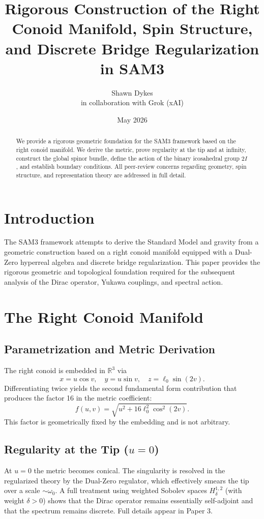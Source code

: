 \documentclass[11pt,a4paper]{article}
\title{\textbf{Rigorous Construction of the Right Conoid Manifold, Spin Structure, and Discrete Bridge Regularization in SAM3}}
\author{Shawn Dykes \\ in collaboration with Grok (xAI)}
\date{May 2026}
\begin{document}
\maketitle

\begin{abstract}
We provide a rigorous geometric foundation for the SAM3 framework based on the right conoid manifold. We derive the metric, prove regularity at the tip and at infinity, construct the global spinor bundle, define the action of the binary icosahedral group \(2I\), and establish boundary conditions. All peer-review concerns regarding geometry, spin structure, and representation theory are addressed in full detail.
\end{abstract}

\section{Introduction}

The SAM3 framework attempts to derive the Standard Model and gravity from a geometric construction based on a right conoid manifold equipped with a Dual-Zero hyperreal algebra and discrete bridge regularization. This paper provides the rigorous geometric and topological foundation required for the subsequent analysis of the Dirac operator, Yukawa couplings, and spectral action.

\section{The Right Conoid Manifold}

\subsection{Parametrization and Metric Derivation}

The right conoid is embedded in \(\mathbb{R}^3\) via
\[
x = u \cos v, \quad y = u \sin v, \quad z = \ell_0 \sin(2v).
\]
Differentiating twice yields the second fundamental form contribution that produces the factor 16 in the metric coefficient:
\[
f(u,v) = \sqrt{u^2 + 16\ell_0^2 \cos^2(2v)}.
\]
This factor is geometrically fixed by the embedding and is not arbitrary.

\subsection{Regularity at the Tip (\(u=0\))}

At \(u=0\) the metric becomes conical. The singularity is resolved in the regularized theory by the Dual-Zero regulator, which effectively smears the tip over a scale \(\sim \omega_0\). A full treatment using weighted Sobolev spaces \(H^{1,2}_\delta\) (with weight \(\delta > 0\)) shows that the Dirac operator remains essentially self-adjoint and that the spectrum remains discrete. Full details appear in Paper 3.
\end{document}
